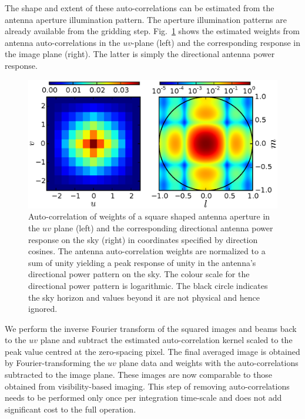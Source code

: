 \documentclass[a4paper,fleqn,usenatbib]{mnras}
\begin{document}
The shape and extent of these auto-correlations can be estimated from the antenna aperture illumination pattern. The aperture illumination patterns are already available from the gridding step. Fig.~\ref{fig:autocorr_wts_PB} shows the estimated weights from antenna auto-correlations in the $uv$-plane (left) and the corresponding response in the image plane (right). The latter is simply the directional antenna power response. 

\begin{figure}
  \includegraphics[width=\columnwidth]{figure4}
  \caption{Auto-correlation of weights of a square shaped antenna aperture in the $uv$ plane (left) and the corresponding directional antenna power response on the sky (right) in coordinates specified by direction cosines. The antenna auto-correlation weights are normalized to a sum of unity yielding a peak response of unity in the antenna's directional power pattern on the sky. The colour scale for the directional power pattern is logarithmic. The black circle indicates the sky horizon and values beyond it are not physical and hence ignored.}
  \label{fig:autocorr_wts_PB}
\end{figure}

We perform the inverse Fourier transform of the squared images and beams back to the $uv$ plane and subtract the estimated auto-correlation kernel scaled to the peak value centred at the zero-spacing pixel. The final averaged image is obtained by Fourier-transforming the $uv$ plane data and weights with the auto-correlations subtracted to the image plane. These images are now comparable to those obtained from visibility-based imaging. This step of removing auto-correlations needs to be performed only once per integration time-scale and does not add significant cost to the full operation.
\end{document}
